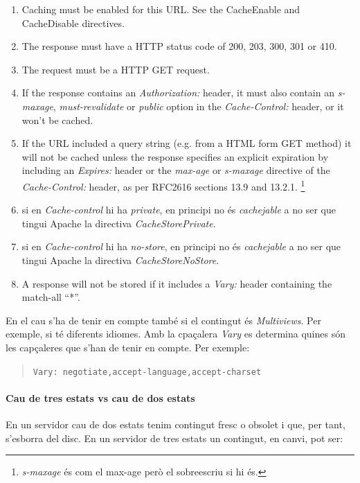 \documentclass[a4paper, 11pt]{article}
\begin{document}
\begin{enumerate}
	\item Caching must be enabled for this URL. See the CacheEnable and CacheDisable directives.
	\item The response must have a HTTP status code of 200, 203, 300, 301 or 410.
	\item The request must be a HTTP GET request.
	\item If the response contains an \textit{Authorization:} header, it must also contain an \textit{s-maxage}, \textit{must-revalidate} or \textit{public} option in the \textit{Cache-Control:} header, or it won't be cached.
	\item If the URL included a query string (e.g. from a HTML form GET method) it will not be cached unless the response specifies an explicit expiration by including an \textit{Expires:} header or the \textit{max-age} or \textit{s-maxage} directive of the \textit{Cache-Control:} header, as per RFC2616 sections 13.9 and 13.2.1. \footnote{\textit{s-maxage} \'es com el max-age però el sobreescriu si hi \'es.}
  \item si en \textit{Cache-control} hi ha \textit{private}, en principi no \'es \textit{cachejable} a no ser que tingui Apache la directiva \textit{CacheStorePrivate}.
  \item si en \textit{Cache-control} hi ha \textit{no-store}, en principi no \'es \textit{cachejable} a no ser que tingui Apache la directiva \textit{CacheStoreNoStore}.
	\item A response will not be stored if it includes a \textit{Vary:} header containing the match-all ``*''.
\end{enumerate}

En el cau s'ha de tenir en compte tamb\'e si el contingut \'es \textit{Multiviews}. Per exemple, si t\'e diferents idiomes. Amb la cpaçalera \textit{Vary} es determina quines són les capçaleres que s'han de tenir en compte. Per exemple:
\begin{quote}
	\verb+Vary: negotiate,accept-language,accept-charset+
\end{quote}

\paragraph{Cau de tres estats vs cau de dos estats \\}

En un servidor cau de dos estats tenim contingut fresc o obsolet i que, per tant, s'esborra del disc. En un servidor de tres estats un contingut, en canvi, pot ser:
\end{document}
